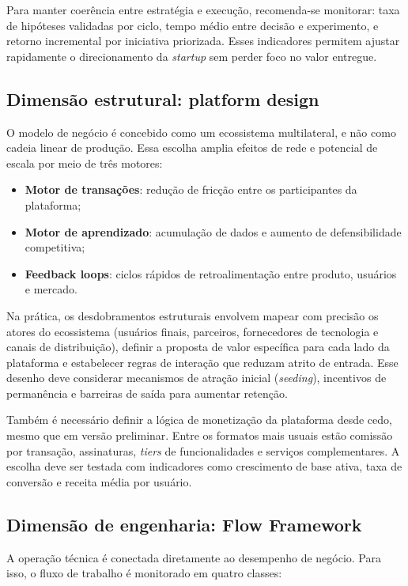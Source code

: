 Para manter coerência entre estratégia e execução, recomenda-se monitorar: taxa de hipóteses validadas por ciclo, tempo médio entre decisão e experimento, e retorno incremental por iniciativa priorizada. Esses indicadores permitem ajustar rapidamente o direcionamento da \textit{startup} sem perder foco no valor entregue.

\subsection{Dimensão estrutural: platform design}

O modelo de negócio é concebido como um ecossistema multilateral, e não como cadeia linear de produção. Essa escolha amplia efeitos de rede e potencial de escala por meio de três motores:

\begin{itemize}
    \item \textbf{Motor de transações}: redução de fricção entre os participantes da plataforma;
    \item \textbf{Motor de aprendizado}: acumulação de dados e aumento de defensibilidade competitiva;
    \item \textbf{Feedback loops}: ciclos rápidos de retroalimentação entre produto, usuários e mercado.
\end{itemize}

Na prática, os desdobramentos estruturais envolvem mapear com precisão os atores do ecossistema (usuários finais, parceiros, fornecedores de tecnologia e canais de distribuição), definir a proposta de valor específica para cada lado da plataforma e estabelecer regras de interação que reduzam atrito de entrada. Esse desenho deve considerar mecanismos de atração inicial (\textit{seeding}), incentivos de permanência e barreiras de saída para aumentar retenção.

Também é necessário definir a lógica de monetização da plataforma desde cedo, mesmo que em versão preliminar. Entre os formatos mais usuais estão comissão por transação, assinaturas, \textit{tiers} de funcionalidades e serviços complementares. A escolha deve ser testada com indicadores como crescimento de base ativa, taxa de conversão e receita média por usuário.

\subsection{Dimensão de engenharia: Flow Framework}

A operação técnica é conectada diretamente ao desempenho de negócio. Para isso, o fluxo de trabalho é monitorado em quatro classes:

